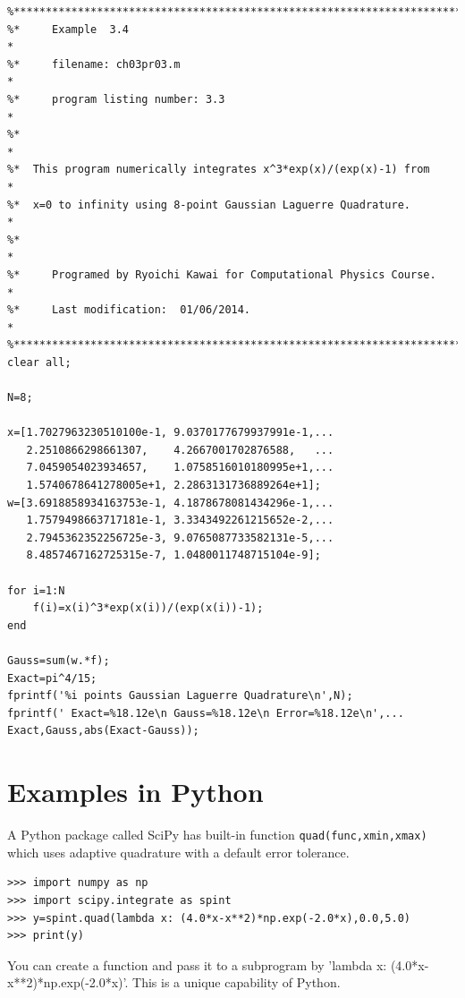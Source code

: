 \newpage
\bigskip
\noindent
\program
\label{matlab:gauss-lagurre}
\footnotesize
\begin{verbatim}
%**************************************************************************
%*     Example  3.4                                                       *
%*     filename: ch03pr03.m                                               *
%*     program listing number: 3.3                                        *
%*                                                                        *
%*  This program numerically integrates x^3*exp(x)/(exp(x)-1) from        *
%*  x=0 to infinity using 8-point Gaussian Laguerre Quadrature.           *
%*                                                                        *
%*     Programed by Ryoichi Kawai for Computational Physics Course.       *
%*     Last modification:  01/06/2014.                                    *
%**************************************************************************
clear all;

N=8;

x=[1.7027963230510100e-1, 9.0370177679937991e-1,...
   2.2510866298661307,    4.2667001702876588,   ...
   7.0459054023934657,    1.0758516010180995e+1,...
   1.5740678641278005e+1, 2.2863131736889264e+1];
w=[3.6918858934163753e-1, 4.1878678081434296e-1,...
   1.7579498663717181e-1, 3.3343492261215652e-2,...
   2.7945362352256725e-3, 9.0765087733582131e-5,...
   8.4857467162725315e-7, 1.0480011748715104e-9];

for i=1:N
    f(i)=x(i)^3*exp(x(i))/(exp(x(i))-1);
end

Gauss=sum(w.*f);
Exact=pi^4/15;
fprintf('%i points Gaussian Laguerre Quadrature\n',N);
fprintf(' Exact=%18.12e\n Gauss=%18.12e\n Error=%18.12e\n',...
Exact,Gauss,abs(Exact-Gauss));
\end{verbatim}
\normalsize

\bigskip
\noindent
\section*{Examples in Python}

\bigskip
\setcounter{exampnum}{1}

\noindent
\begin{example}

A Python package called SciPy has  built-in function \texttt{quad(func,xmin,xmax)} which uses adaptive quadrature with a default error tolerance.
\begin{center}
\begin{minipage}{0.95\textwidth}
\small
\begin{Verbatim}[frame=single]
>>> import numpy as np
>>> import scipy.integrate as spint
>>> y=spint.quad(lambda x: (4.0*x-x**2)*np.exp(-2.0*x),0.0,5.0)
>>> print(y)
\end{Verbatim}
\normalsize
\end{minipage}
\end{center}

\noindent
You can create a function and pass it to a subprogram by 'lambda x:  (4.0*x-x**2)*np.exp(-2.0*x)'.  This is a unique capability of Python.
\end{example}


